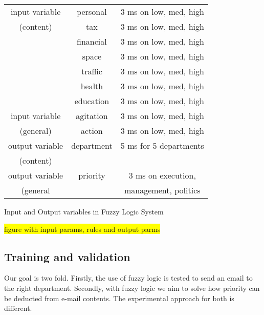 \documentclass[journal]{IEEEtran}
\begin{document}
\begin{center}
\begin{tabular}{ |c|c|c| } 
 \hline
 input variable     & personal  & 3 ms on low, med, high    \\ 
 (content)          & tax       & 3 ms on low, med, high    \\ 
                    & financial & 3 ms on low, med, high    \\ 
                    & space     & 3 ms on low, med, high    \\
                    & traffic   & 3 ms on low, med, high    \\ 
                    & health    & 3 ms on low, med, high    \\
                    & education & 3 ms on low, med, high    \\
 input variable     & agitation & 3 ms on low, med, high    \\
 (general)          & action    & 3 ms on low, med, high    \\
 output variable    & department & 5 ms for 5 departments   \\
 (content)          &           &                           \\  
 output variable    & priority  & 3 ms on execution,        \\    
 (general           &           & management, politics      \\
 
\hline
\end{tabular}
\label{table:1}
Input and Output variables in Fuzzy Logic System
\end{center}

\colorbox{yellow}{figure with input params, rules and output parms}

\subsection{Training and validation}

Our goal is two fold. Firstly, the use of fuzzy logic is tested to send an email to the right department. Secondly, with fuzzy logic we aim to solve how priority can be deducted from e-mail contents. The experimental approach for both is different. 
\end{document}

